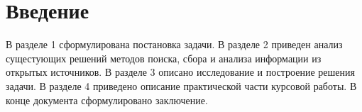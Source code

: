 \section{Введение}
\label{sec:Chapter0} 
В разделе 1 сформулирована постановка задачи. 
В разделе 2 приведен анализ сущестующих решений методов поиска, сбора и анализа информации из открытых источников. 
В разделе 3 описано исследование и построение решения задачи. 
В разделе 4 приведено описание практической части курсовой работы. 
В конце документа сформулировано заключение.
